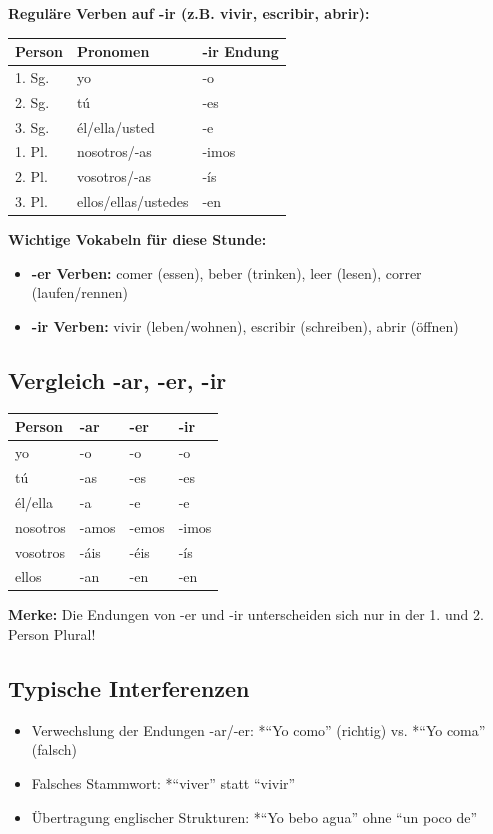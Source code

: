 \documentclass[11pt,a4paper]{article}
\begin{document}
\textbf{Reguläre Verben auf -ir (z.B. vivir, escribir, abrir):}
\begin{center}
\begin{tabular}{|l|l|l|}
\hline
\textbf{Person} & \textbf{Pronomen} & \textbf{-ir Endung} \\
\hline
1. Sg. & yo & -o \\
2. Sg. & tú & -es \\
3. Sg. & él/ella/usted & -e \\
1. Pl. & nosotros/-as & -imos \\
2. Pl. & vosotros/-as & -ís \\
3. Pl. & ellos/ellas/ustedes & -en \\
\hline
\end{tabular}
\end{center}

\textbf{Wichtige Vokabeln für diese Stunde:}
\begin{itemize}
    \item \textbf{-er Verben:} comer (essen), beber (trinken), leer (lesen), correr (laufen/rennen)
    \item \textbf{-ir Verben:} vivir (leben/wohnen), escribir (schreiben), abrir (öffnen)
\end{itemize}

\subsection{Vergleich -ar, -er, -ir}

\begin{center}
\begin{tabular}{|l|l|l|l|}
\hline
\textbf{Person} & \textbf{-ar} & \textbf{-er} & \textbf{-ir} \\
\hline
yo & -o & -o & -o \\
tú & -as & -es & -es \\
él/ella & -a & -e & -e \\
nosotros & -amos & -emos & -imos \\
vosotros & -áis & -éis & -ís \\
ellos & -an & -en & -en \\
\hline
\end{tabular}
\end{center}

\textbf{Merke:} Die Endungen von -er und -ir unterscheiden sich nur in der 1. und 2. Person Plural!

\subsection{Typische Interferenzen}
\begin{itemize}
    \item Verwechslung der Endungen -ar/-er: *``Yo como'' (richtig) vs. *``Yo coma'' (falsch)
    \item Falsches Stammwort: *``viver'' statt ``vivir''
    \item Übertragung englischer Strukturen: *``Yo bebo agua'' ohne ``un poco de''
\end{itemize}
\end{document}
